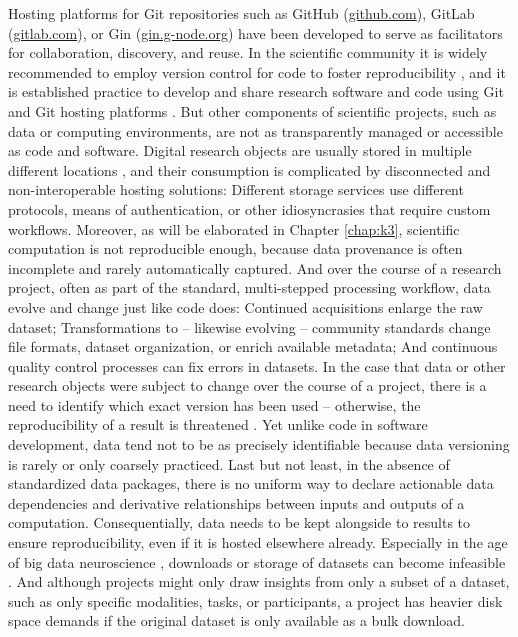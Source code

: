 Hosting platforms for Git repositories such as GitHub (\url{github.com}), GitLab ({\url{gitlab.com}), or Gin (\url{gin.g-node.org}) have been developed to serve as facilitators for collaboration, discovery, and reuse.
In the scientific community it is widely recommended to employ version control for code to foster reproducibility \citep[e.g.,][]{sandve2013ten}, and it is established practice to develop and share research software and code using Git and Git hosting platforms \citep[e.g.,][]{nord2019towards, strupler2017reproducibility, bryan2018excuse, corti2019managing}.
But other components of scientific projects, such as data or computing environments, are not as transparently managed or accessible as code and software.
Digital research objects are usually stored in multiple different locations \citep{parsons2013research}, and their consumption is complicated by disconnected and non-interoperable hosting solutions:
Different storage services use different protocols, means of authentication, or other idiosyncrasies that require custom workflows.
Moreover, as will be elaborated in Chapter \ref{chap:k3}, scientific computation is not reproducible enough, because data provenance is often incomplete and rarely automatically captured.
And over the course of a research project, often as part of the standard, multi-stepped processing workflow, data evolve and change just like code does:
Continued acquisitions enlarge the raw dataset; Transformations to -- likewise evolving -- community standards change file formats, dataset organization, or enrich available metadata; And continuous quality control processes can fix errors in datasets.
In the case that data or other research objects were subject to change over the course of a project, there is a need to identify which exact version has been used -- otherwise, the reproducibility of a result is threatened \citep{hardwicke2018data}.
Yet unlike code in software development, data tend not to be as precisely identifiable because data versioning is rarely or only coarsely practiced.
Last but not least, in the absence of standardized data packages, there is no uniform way to declare actionable
data dependencies and derivative relationships between inputs and outputs of a computation.
Consequentially, data needs to be kept alongside to results to ensure reproducibility, even if it is hosted elsewhere already.
Especially in the age of big data neuroscience \citep{bzdok2017inference}, downloads or storage of datasets can become infeasible \citep{horien2021hitchhiker, grisham2016proposed}.
And although projects might only draw insights from only a subset of a dataset, such as only specific modalities, tasks, or participants, a project has heavier disk space demands if the original dataset is only available as a bulk download.\\
}
